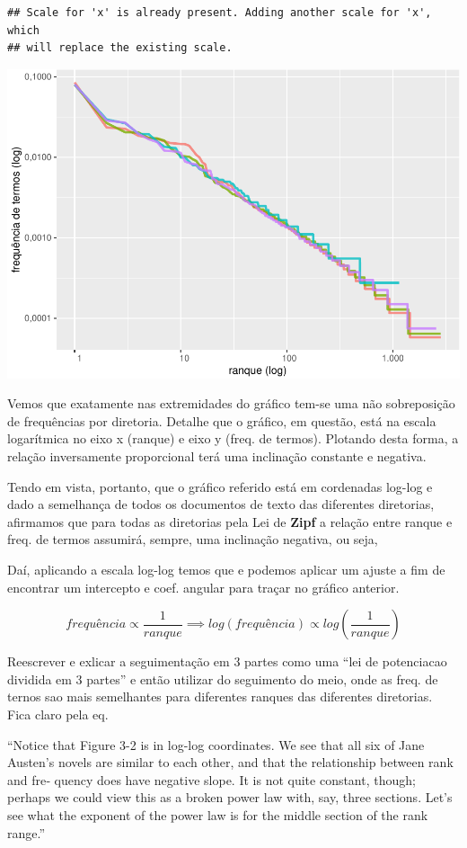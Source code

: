 \documentclass[]{article}
\begin{document}
\begin{verbatim}
## Scale for 'x' is already present. Adding another scale for 'x', which
## will replace the existing scale.
\end{verbatim}

\includegraphics{markdown_v50_files/figure-latex/unnamed-chunk-39-1.pdf}

Vemos que exatamente nas extremidades do gráfico tem-se uma não
sobreposição de frequências por diretoria. Detalhe que o gráfico, em
questão, está na escala logarítmica no eixo x (ranque) e eixo y (freq.
de termos). Plotando desta forma, a relação inversamente proporcional
terá uma inclinação constante e negativa.

Tendo em vista, portanto, que o gráfico referido está em cordenadas
log-log e dado a semelhança de todos os documentos de texto das
diferentes diretorias, afirmamos que para todas as diretorias pela Lei
de \textbf{Zipf} a relação entre ranque e freq. de termos assumirá,
sempre, uma inclinação negativa, ou seja,

Daí, aplicando a escala log-log temos que e podemos aplicar um ajuste a
fim de encontrar um intercepto e coef. angular para traçar no gráfico
anterior.

\[
frequência \propto \frac{1}{ranque} \implies log(frequência) \propto log\left(\frac{1}{ranque}\right)
\]

Reescrever e exlicar a seguimentação em 3 partes como uma ``lei de
potenciacao dividida em 3 partes'' e então utilizar do seguimento do
meio, onde as freq. de ternos sao mais semelhantes para diferentes
ranques das diferentes diretorias. Fica claro pela eq.

``Notice that Figure 3-2 is in log-log coordinates. We see that all six
of Jane Austen's novels are similar to each other, and that the
relationship between rank and fre‐ quency does have negative slope. It
is not quite constant, though; perhaps we could view this as a broken
power law with, say, three sections. Let's see what the exponent of the
power law is for the middle section of the rank range.''
\end{document}
